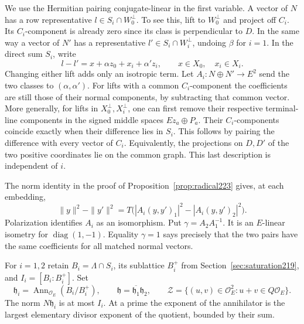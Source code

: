 \documentclass[a4paper,11pt]{article}
\theoremstyle{definition}
\theoremstyle{remark}
\numberwithin{equation}{section}
\begin{document}
We use the Hermitian pairing conjugate-linear in the first
variable. A vector of \(N\) has a row representative
\(l\in S_i\cap W_0^\perp\). To see this, lift to \(W_0^\perp\)
and project off \(C_i\). Its \(C_i\)-component is already
zero since its class is perpendicular to \(D\). In the
same way a vector of \(N'\) has a representative
\(l'\in S_i\cap W_i^\perp\), undoing \(\beta\) for \(i=1\).
In the direct sum \(S_i\), write
\[
 l-l'=x+\alpha z_0+x_i+\alpha' z_i,\qquad
                   x\in X_0,\quad x_i\in X_i.
\]
Changing either lift adds only an isotropic term. Let
\(A_i:N\oplus N'\to E^2\) send the two classes to
\((\alpha,\alpha')\). For lifts with a common \(C_i\)-component
the coefficients are still those of their normal components,
by subtracting that common vector. More generally, for lifts
in \(X_0^\perp,X_i^\perp\), one can first remove their respective
terminal-line components in the signed middle spaces
\(Ez_a\oplus P_a\). Their \(C_i\)-components coincide exactly
when their difference lies in \(S_i\). This follows by pairing
the difference with every vector of \(C_i\). Equivalently, the
projections on \(D,D'\) of the two positive coordinates lie on
the common graph. This last description is independent of \(i\).

The norm identity in the proof of Proposition~\ref{prop:radical223}
gives, at each embedding,
\[
          \|y\|^2-\|y'\|^2
       =T\bigl(|A_i(y,y')_1|^2-|A_i(y,y')_2|^2\bigr).
\]
Polarization identifies \(A_i\) as an isomorphism. Put
\(\gamma=A_2 A_1^{-1}\). It is an \(E\)-linear isometry for
\(\operatorname{diag}(1,-1)\). Equality \(\gamma=1\) says
precisely that the two pairs have the same coefficients for
all matched normal vectors.

For \(i=1,2\) retain \(B_i=\Lambda\cap S_i\), its sublattice
\(B_i^+\) from Section~\ref{sec:saturation219}, and
\(I_i=[B_i:B_i^+]\). Set
\[
 \mathfrak h_i=\operatorname{Ann}_{\mathcal O_E}(B_i/B_i^+),
 \qquad \mathfrak h=\overline{\mathfrak h_1}\mathfrak h_2,
 \qquad
 \mathcal Z=\{(u,v)\in\mathcal O_E^2:u+v\in Q\mathcal O_E\}.
\]
The norm \(N\mathfrak h_i\) is at most \(I_i\). At a prime
the exponent of the annihilator is the largest elementary
divisor exponent of the quotient, bounded by their sum.
\end{document}

